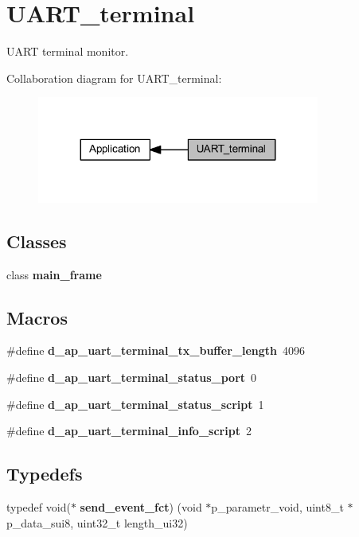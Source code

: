 \section{U\+A\+R\+T\+\_\+terminal}
\label{group___u_a_r_t__terminal}


U\+A\+RT terminal monitor.  


Collaboration diagram for U\+A\+R\+T\+\_\+terminal\+:
\nopagebreak
\begin{figure}[H]
\begin{center}
\leavevmode
\includegraphics[width=263pt]{group___u_a_r_t__terminal}
\end{center}
\end{figure}
\subsection*{Classes}
\begin{DoxyCompactItemize}
\item 
class \textbf{ main\+\_\+frame}
\end{DoxyCompactItemize}
\subsection*{Macros}
\begin{DoxyCompactItemize}
\item 
\#define \textbf{ d\+\_\+ap\+\_\+uart\+\_\+terminal\+\_\+tx\+\_\+buffer\+\_\+length}~4096
\item 
\mbox{\label{group___u_a_r_t__terminal_ga8ef5406c651e45ccfc2cdc1c87490a8b}} 
\#define {\bfseries d\+\_\+ap\+\_\+uart\+\_\+terminal\+\_\+status\+\_\+port}~0
\item 
\mbox{\label{group___u_a_r_t__terminal_ga5d02361a165f63fdcdb611f9371e07ac}} 
\#define {\bfseries d\+\_\+ap\+\_\+uart\+\_\+terminal\+\_\+status\+\_\+script}~1
\item 
\mbox{\label{group___u_a_r_t__terminal_ga32886d66bfdbab0e9e6f73b63f06b7dd}} 
\#define {\bfseries d\+\_\+ap\+\_\+uart\+\_\+terminal\+\_\+info\+\_\+script}~2
\end{DoxyCompactItemize}
\subsection*{Typedefs}
\begin{DoxyCompactItemize}
\item 
typedef void($\ast$ \textbf{ send\+\_\+event\+\_\+fct}) (void $\ast$p\+\_\+parametr\+\_\+void, uint8\+\_\+t $\ast$p\+\_\+data\+\_\+sui8, uint32\+\_\+t length\+\_\+ui32)
\end{DoxyCompactItemize}
